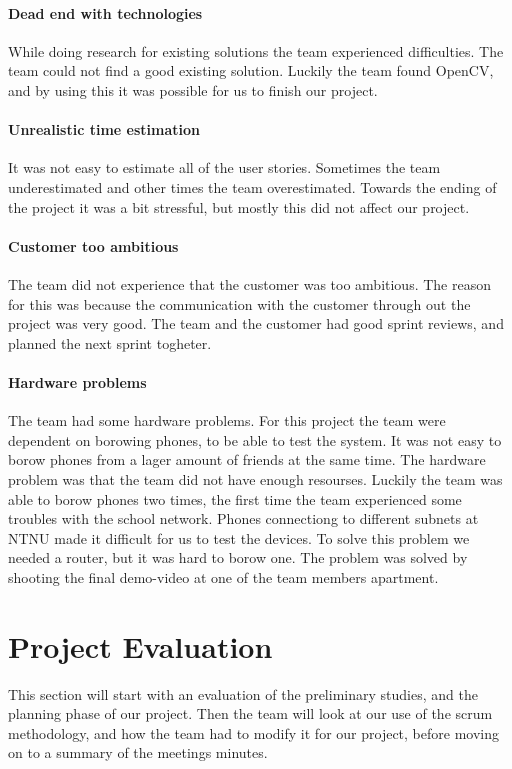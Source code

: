 \paragraph{Dead end with technologies}
While doing research for existing solutions the team experienced difficulties. The team could not find a good existing solution. Luckily the team found OpenCV, and by using this it was possible for us to finish our project. 

\paragraph{Unrealistic time estimation}
It was not easy to estimate all of the user stories. Sometimes the team underestimated and other times the team overestimated. Towards the ending of the project it was a bit stressful, but mostly this did not affect our project.

\paragraph{Customer too ambitious}
The team did not experience that the customer was too ambitious. The reason for this was because the communication with the customer through out the project was very good. The team and the customer had good sprint reviews, and planned the next sprint togheter.

\paragraph{Hardware problems}
The team had some hardware problems. For this project the team were dependent on borowing phones, to be able to test the system. It was not easy to borow phones from a lager amount of friends at the same time. The hardware problem was that the team did not have enough resourses. Luckily the team was able to borow phones two times, the first time the team experienced some troubles with the school network. Phones connectiong to different subnets at NTNU made it difficult for us to test the devices. To solve this problem we needed a router, but it was hard to borow one. The problem was solved by shooting the final demo-video at one of the team members apartment.  
\section{Project Evaluation}
This section will start with an evaluation of the preliminary studies, and the planning phase of our project.  
Then the team will look at our use of the scrum methodology, and how the team had to modify it for our project, before moving on to a summary of the meetings minutes. 

